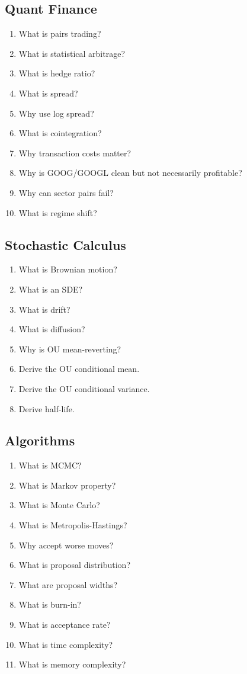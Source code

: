\documentclass[11pt]{article}
\begin{document}
\subsection{Quant Finance}

\begin{enumerate}
  \item What is pairs trading?
  \item What is statistical arbitrage?
  \item What is hedge ratio?
  \item What is spread?
  \item Why use log spread?
  \item What is cointegration?
  \item Why transaction costs matter?
  \item Why is GOOG/GOOGL clean but not necessarily profitable?
  \item Why can sector pairs fail?
  \item What is regime shift?
\end{enumerate}

\subsection{Stochastic Calculus}

\begin{enumerate}
  \item What is Brownian motion?
  \item What is an SDE?
  \item What is drift?
  \item What is diffusion?
  \item Why is OU mean-reverting?
  \item Derive the OU conditional mean.
  \item Derive the OU conditional variance.
  \item Derive half-life.
\end{enumerate}

\subsection{Algorithms}

\begin{enumerate}
  \item What is MCMC?
  \item What is Markov property?
  \item What is Monte Carlo?
  \item What is Metropolis-Hastings?
  \item Why accept worse moves?
  \item What is proposal distribution?
  \item What are proposal widths?
  \item What is burn-in?
  \item What is acceptance rate?
  \item What is time complexity?
  \item What is memory complexity?
\end{enumerate}
\end{document}
